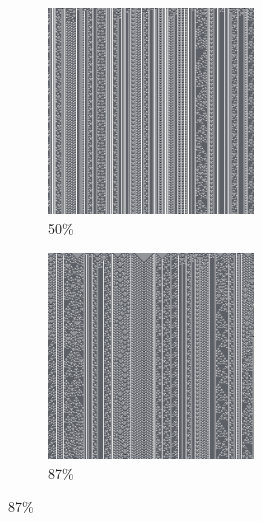 \documentclass[12pt, fleqn]{report}                             %
\theoremstyle{break}                                            %
\begin{document}
\begin{figure}[ht!]
\begin{subfigure}[b]{0.4\linewidth}
          \includegraphics[width=0.6\textwidth]{Images/73/c.png}
          \caption{50\%}
        \end{subfigure}
        \begin{subfigure}[b]{0.4\linewidth}
          \includegraphics[width=0.6\textwidth]{Images/73/d.png}
          \caption{87\%}
        \end{subfigure}
      \end{figure}
\end{document}
